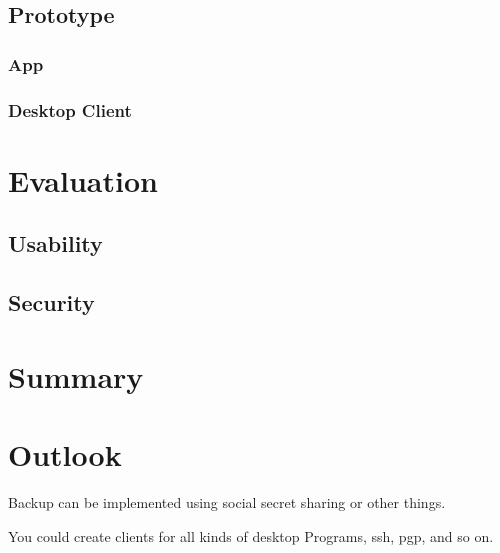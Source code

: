 \documentclass[12pt,oneside,a4paper,parskip]{scrbook}
\begin{document}
\section{Prototype}

\subsection{App}

\subsection{Desktop Client}



\chapter{Evaluation}

\section{Usability}

\section{Security}



\chapter{Summary}

\chapter{Outlook}

Backup can be implemented using social secret sharing or other things.

You could create clients for all kinds of desktop Programs, ssh, pgp, and so on.
\end{document}
